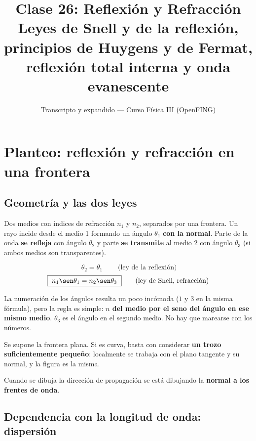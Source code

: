\documentclass[12pt,a4paper]{article}
\title{\textbf{Clase 26: Reflexión y Refracción}\\[0.3em]
        \large{Leyes de Snell y de la reflexión, principios de Huygens y de
              Fermat, reflexión total interna y onda evanescente}}
\author{Transcripto y expandido --- Curso Física III (OpenFING)}
\date{}
\begin{document}
\maketitle
\thispagestyle{empty}
\newpage

\tableofcontents
\newpage

\section{Planteo: reflexión y refracción en una frontera}

\subsection{Geometría y las dos leyes}

Dos medios con índices de refracción $n_1$ y $n_2$, separados por una frontera.
Un rayo incide desde el medio 1 formando un ángulo $\theta_1$ \textbf{con la
normal}. Parte de la onda \textbf{se refleja} con ángulo $\theta_2$ y parte
\textbf{se transmite} al medio 2 con ángulo $\theta_3$ (si ambos medios son
transparentes).

\begin{keybox}
\[
\boxed{\ \theta_2 = \theta_1\ } \qquad \text{(ley de la reflexión)}
\]
\[
\boxed{\ n_1 \sen\theta_1 = n_2 \sen\theta_3\ }
\qquad \text{(ley de Snell, refracción)}
\]
\end{keybox}

\begin{notebox}
La numeración de los ángulos resulta un poco incómoda ($1$ y $3$ en la misma
fórmula), pero la regla es simple: \textbf{$n$ del medio por el seno del ángulo
en ese mismo medio}. $\theta_3$ es el ángulo en el segundo medio. No hay que
marearse con los números.
\end{notebox}

\begin{notebox}
Se supone la frontera plana. Si es curva, basta con considerar \textbf{un trozo
suficientemente pequeño}: localmente se trabaja con el plano tangente y su
normal, y la figura es la misma.
\end{notebox}

Cuando se dibuja la dirección de propagación se está dibujando la \textbf{normal
a los frentes de onda}.

\subsection{Dependencia con la longitud de onda: dispersión}
\end{document}
